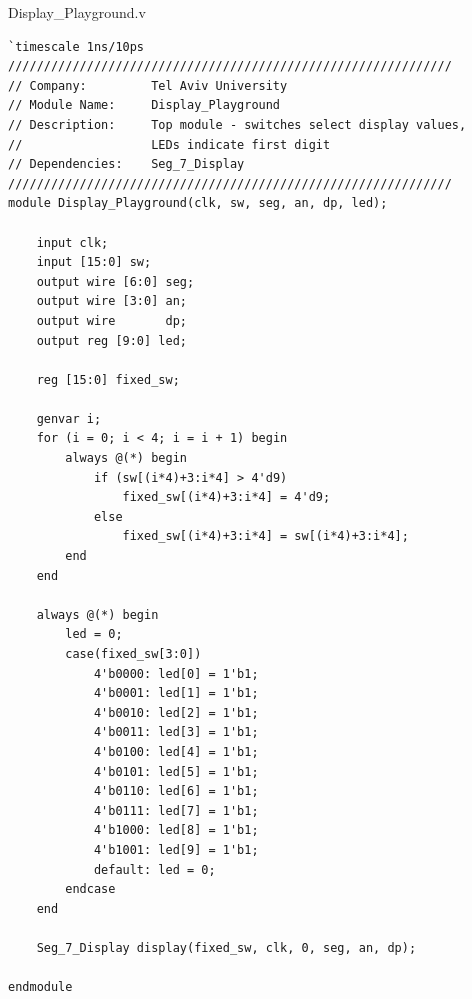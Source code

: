 \documentclass[11pt]{article}
\begin{document}
\newpage

Display\_Playground.v

\begin{lstlisting}
`timescale 1ns/10ps
//////////////////////////////////////////////////////////////
// Company:         Tel Aviv University
// Module Name:     Display_Playground
// Description:     Top module - switches select display values,
//                  LEDs indicate first digit
// Dependencies:    Seg_7_Display
//////////////////////////////////////////////////////////////
module Display_Playground(clk, sw, seg, an, dp, led);

    input clk;
    input [15:0] sw;
    output wire [6:0] seg;
    output wire [3:0] an;
    output wire       dp;
    output reg [9:0] led;

    reg [15:0] fixed_sw;

    genvar i;
    for (i = 0; i < 4; i = i + 1) begin
        always @(*) begin
            if (sw[(i*4)+3:i*4] > 4'd9)
                fixed_sw[(i*4)+3:i*4] = 4'd9;
            else
                fixed_sw[(i*4)+3:i*4] = sw[(i*4)+3:i*4];
        end
    end

    always @(*) begin
        led = 0;
        case(fixed_sw[3:0])
            4'b0000: led[0] = 1'b1;
            4'b0001: led[1] = 1'b1;
            4'b0010: led[2] = 1'b1;
            4'b0011: led[3] = 1'b1;
            4'b0100: led[4] = 1'b1;
            4'b0101: led[5] = 1'b1;
            4'b0110: led[6] = 1'b1;
            4'b0111: led[7] = 1'b1;
            4'b1000: led[8] = 1'b1;
            4'b1001: led[9] = 1'b1;
            default: led = 0;
        endcase
    end

    Seg_7_Display display(fixed_sw, clk, 0, seg, an, dp);

endmodule
\end{lstlisting}
\end{document}
